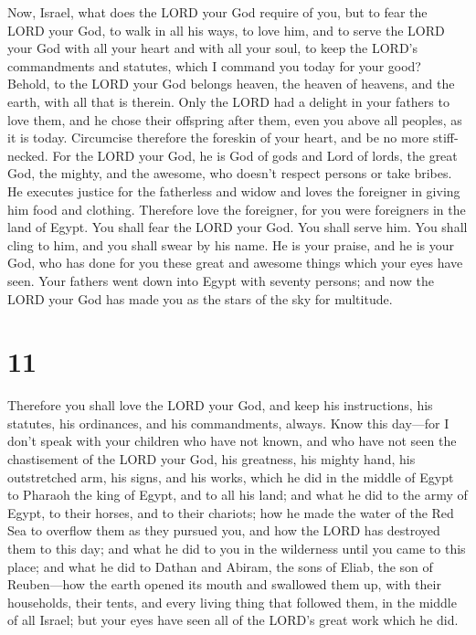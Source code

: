  Now, Israel, what does the LORD your God require of you,
but to fear the LORD your God, to walk in all his ways, to love him, and
to serve the LORD your God with all your heart and with all your soul,
 to keep the LORD's commandments and statutes, which I
command you today for your good?  Behold, to the LORD your
God belongs heaven, the heaven of heavens, and the earth, with all that
is therein.  Only the LORD had a delight in your fathers to
love them, and he chose their offspring after them, even you above all
peoples, as it is today.  Circumcise therefore the foreskin
of your heart, and be no more stiff-necked.  For the LORD
your God, he is God of gods and Lord of lords, the great God, the
mighty, and the awesome, who doesn't respect persons or take bribes.
 He executes justice for the fatherless and widow and loves
the foreigner in giving him food and clothing.  Therefore
love the foreigner, for you were foreigners in the land of Egypt.
 You shall fear the LORD your God. You shall serve him. You
shall cling to him, and you shall swear by his name.  He is
your praise, and he is your God, who has done for you these great and
awesome things which your eyes have seen.  Your fathers
went down into Egypt with seventy persons; and now the LORD your God has
made you as the stars of the sky for multitude.

\hypertarget{section-10}{%
\section{11}\label{section-10}}

 Therefore you shall love the LORD your God, and keep his
instructions, his statutes, his ordinances, and his commandments,
always.  Know this day---for I don't speak with your
children who have not known, and who have not seen the chastisement of
the LORD your God, his greatness, his mighty hand, his outstretched arm,
 his signs, and his works, which he did in the middle of
Egypt to Pharaoh the king of Egypt, and to all his land; 
and what he did to the army of Egypt, to their horses, and to their
chariots; how he made the water of the Red Sea to overflow them as they
pursued you, and how the LORD has destroyed them to this day;
 and what he did to you in the wilderness until you came to
this place;  and what he did to Dathan and Abiram, the sons
of Eliab, the son of Reuben---how the earth opened its mouth and
swallowed them up, with their households, their tents, and every living
thing that followed them, in the middle of all Israel;  but
your eyes have seen all of the LORD's great work which he did.


